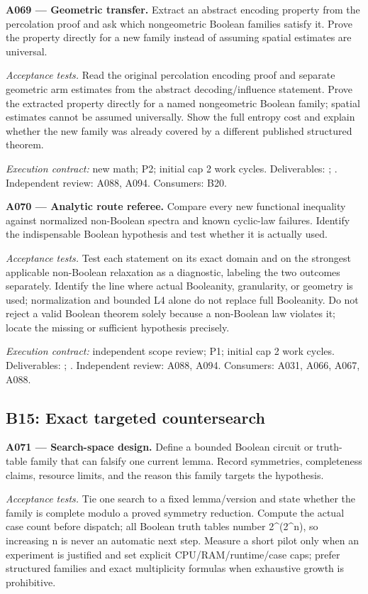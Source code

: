 \documentclass[11pt]{article}
\begin{document}
\textbf{A069 --- Geometric transfer.} Extract an abstract encoding property from the percolation proof and ask which nongeometric Boolean families satisfy it. Prove the property directly for a new family instead of assuming spatial estimates are universal.

\emph{Acceptance tests.} Read the original percolation encoding proof and separate geometric arm estimates from the abstract decoding/influence statement. Prove the extracted property directly for a named nongeometric Boolean family; spatial estimates cannot be assumed universally. Show the full entropy cost and explain whether the new family was already covered by a different published structured theorem.

{\small\emph{Execution contract:} new math; P2; initial cap 2 work cycles. Deliverables: ; . Independent review: A088, A094. Consumers: B20.}

\textbf{A070 --- Analytic route referee.} Compare every new functional inequality against normalized non-Boolean spectra and known cyclic-law failures. Identify the indispensable Boolean hypothesis and test whether it is actually used.

\emph{Acceptance tests.} Test each statement on its exact domain and on the strongest applicable non-Boolean relaxation as a diagnostic, labeling the two outcomes separately. Identify the line where actual Booleanity, granularity, or geometry is used; normalization and bounded L4 alone do not replace full Booleanity. Do not reject a valid Boolean theorem solely because a non-Boolean law violates it; locate the missing or sufficient hypothesis precisely.

{\small\emph{Execution contract:} independent scope review; P1; initial cap 2 work cycles. Deliverables: ; . Independent review: A088, A094. Consumers: A031, A066, A067, A088.}

\subsection{B15: Exact targeted countersearch}

\textbf{A071 --- Search-space design.} Define a bounded Boolean circuit or truth-table family that can falsify one current lemma. Record symmetries, completeness claims, resource limits, and the reason this family targets the hypothesis.

\emph{Acceptance tests.} Tie one search to a fixed lemma/version and state whether the family is complete modulo a proved symmetry reduction. Compute the actual case count before dispatch; all Boolean truth tables number 2\textasciicircum{}(2\textasciicircum{}n), so increasing n is never an automatic next step. Measure a short pilot only when an experiment is justified and set explicit CPU/RAM/runtime/case caps; prefer structured families and exact multiplicity formulas when exhaustive growth is prohibitive.
\end{document}
